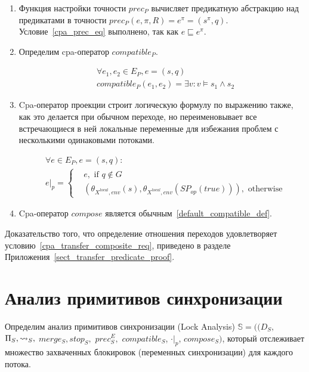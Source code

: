 \begin{enumerate}
\item Функция настройки точности $prec_P$ вычисляет предикатную абстракцию над предикатами в точности $prec_{P}(e, \pi, R) = e^{\pi} = (s^{\pi}, q)$.
Условие~\ref{cpa_prec_eq} выполнено, так как $e \sqsubseteq e^{\pi}$.

\item 
Определим cpa-оператор $compatible_P$.

\begin{equation}
\label{cpa_predicate_compatible}
\begin{aligned}
& \forall e_1, e_2 \in E_P, e = (s, q) \\
& compatible_{P}(e_1, e_2) = \exists v: v \models s_1 \land s_2
\end{aligned}
\end{equation}

\item Cpa-оператор проекции строит логическую формулу по выражению также, как это делается при обычном переходе, но переименовывает все встречающиеся в ней локальные переменные для избежания проблем с несколькими одинаковыми потоками.

\begin{equation}
\begin{aligned}
& \forall e \in E_P, e =(s,q): \\
& e|_p = 
\begin{cases}
&e, \mbox{ if } q \notin G\\
&(\theta_{X^{local},env}(s),\theta_{X^{local},env}(SP_{op}(true))), \mbox{ otherwise}
\end{cases}
\end{aligned}
\end{equation}

\item Cpa-оператор $compose$ является обычным~\ref{default_compatible_def}.

\end{enumerate}

Доказательство того, что определение отношения переходов удовлетворяет условию~\ref{cpa_transfer_composite_req}, приведено в разделе Приложения~\ref{sect_transfer_predicate_proof}. 


\section{Анализ примитивов синхронизации}
\label{sect_lock_analysis}

Определим анализ примитивов синхронизации (Lock Analysis) $\mathbb{S}=((D_{S},$ $\Pi_{S}, \leadsto_{S},$ $merge_{S}, stop_{S},$ $prec^E_{S},$ $compatible_{S}$, $\cdot|_p$, $compose_S)$, который отслеживает множество захваченных блокировок (переменных синхронизации) для каждого потока. 


